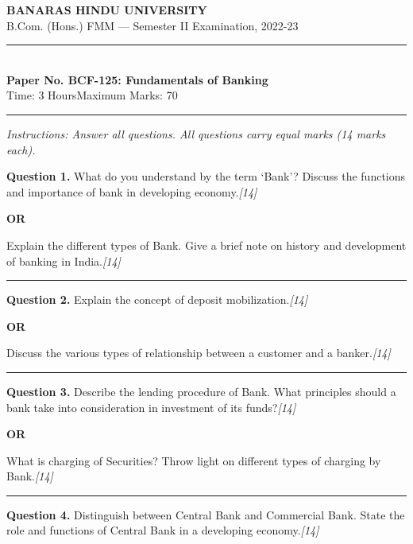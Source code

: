 \documentclass[11pt,a4paper]{article}
\newcommand{\pts}[1]{\hfill   \textit{[#1]}}
\begin{document}
\begin{center}
  {\large\bfseries BANARAS HINDU UNIVERSITY}\\[2pt]
  {\normalsize B.Com. (Hons.) FMM --- Semester II Examination, 2022-23}\\[6pt]
  \rule{0.8\linewidth}{0.5pt}\\[6pt]
  {\large\bfseries Paper No. BCF-125: Fundamentals of Banking}\\[4pt]
  {\normalsize Time: 3 Hours\hfill Maximum Marks: 70}
\end{center}

\rule{\linewidth}{0.4pt}

\smallskip



\noindent   \textit{Instructions: Answer all questions. All questions carry equal marks (14 marks each).}

\bigskip




\noindent   \textbf{Question 1.}
What do you understand by the term `Bank'? Discuss the functions and importance of bank in developing economy.\pts{14}

\centerline{   \textbf{OR}}

Explain the different types of Bank. Give a brief note on history and development of banking in India.\pts{14}

\medskip\rule{\linewidth}{0.2pt}




\noindent   \textbf{Question 2.}
Explain the concept of deposit mobilization.\pts{14}

\centerline{   \textbf{OR}}

Discuss the various types of relationship between a customer and a banker.\pts{14}

\medskip\rule{\linewidth}{0.2pt}




\noindent   \textbf{Question 3.}
Describe the lending procedure of Bank. What principles should a bank take into consideration in investment of its funds?\pts{14}

\centerline{   \textbf{OR}}

What is charging of Securities? Throw light on different types of charging by Bank.\pts{14}

\medskip\rule{\linewidth}{0.2pt}




\noindent   \textbf{Question 4.}
Distinguish between Central Bank and Commercial Bank. State the role and functions of Central Bank in a developing economy.\pts{14}
\end{document}
